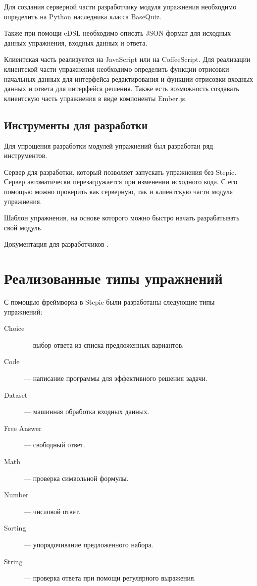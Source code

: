 \documentclass{matmex-diploma-custom}
\begin{document}
Для создания серверной части разработчику модуля упражнения необходимо
определить на Python наследника класса BaseQuiz.

Также при помощи eDSL необходимо описать JSON формат для исходных
данных упражнения, входных данных и ответа.

Клиентская часть реализуется на JavaScript или на CoffeeScript. Для
реализации клиентской части упражнения необходимо определить функции
отрисовки начальных данных для интерфейса редактирования и функции
отрисовки входных данных и ответа для интерфейса решения. Также есть
возможность создавать клиентскую часть упражнения в виде компоненты Ember.js.

\subsection{Инструменты для разработки}
Для упрощения разработки модулей упражнений был разработан ряд
инструментов.

Сервер для разработки, который позволяет запускать упражнения без
Stepic. Сервер автоматически перезагружается при изменении исходного
кода. С его помощью можно проверить как серверную, так и клиентскую
части модуля упражнения.

Шаблон упражнения, на основе которого можно быстро начать
разрабатывать свой модуль.

Документация для разработчиков \cite{plugins:doc}.

\section{Реализованные типы упражнений}

С помощью фреймворка в Stepic были разработаны следующие типы упражнений:
\begin{description}
\item[Choice] --- выбор ответа из списка предложенных вариантов.
\item[Code] --- написание программы для эффективного решения задачи.
\item[Dataset] --- машинная обработка входных данных.
\item[Free Answer] --- свободный ответ.
\item[Math] --- проверка символьной формулы.
\item[Number] --- числовой ответ.
\item[Sorting] --- упорядочивание предложенного набора.
\item[String] --- проверка ответа при помощи регулярного выражения.
\end{description}
\end{document}
